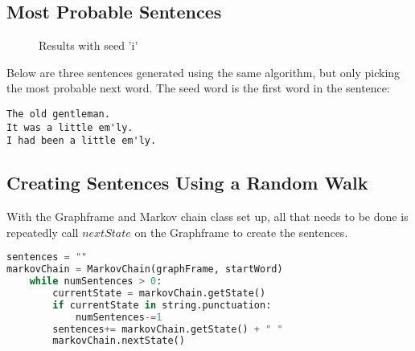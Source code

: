 \documentclass[9pt,twocolumn,twoside]{idsi}
\begin{document}
\subsection{Most Probable Sentences}
\begin{figure}
\caption{Results with seed 'i'}
\end{figure}

Below are three sentences generated using the same algorithm, but only picking the most probable next word. The seed word is the first word in the sentence: 
\begin{lstlisting}
The old gentleman. 
It was a little em'ly. 
I had been a little em'ly.
\end{lstlisting}

\subsection{Creating Sentences Using a Random Walk}
With the Graphframe and Markov chain class set up, all that needs to be done is repeatedly call $nextState$ on the Graphframe to create the sentences. 

\begin{lstlisting}[language=python]
sentences = ""
markovChain = MarkovChain(graphFrame, startWord)
    while numSentences > 0:
        currentState = markovChain.getState()
        if currentState in string.punctuation:
            numSentences-=1
        sentences+= markovChain.getState() + " "
        markovChain.nextState()
\end{lstlisting}
\end{document}
